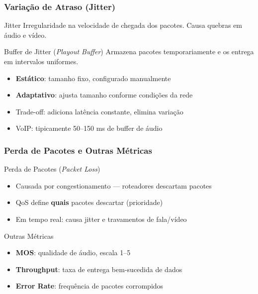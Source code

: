 \documentclass{beamer}
\begin{document}
  \begin{frame}
    \frametitle{Variação de Atraso (Jitter)}
    \begin{block}{Jitter}
      Irregularidade na velocidade de chegada dos pacotes. Causa quebras em
      áudio e vídeo.
    \end{block}
    \vspace{0.5em}
    \begin{block}{Buffer de Jitter (\textit{Playout Buffer})}
      Armazena pacotes temporariamente e os entrega em intervalos uniformes.
      \begin{itemize}
        \item<2-> \textbf{Estático}: tamanho fixo, configurado manualmente
        \item<3-> \textbf{Adaptativo}: ajusta tamanho conforme condições da rede
        \item<4-> Trade-off: adiciona latência constante, elimina variação
        \item<5-> VoIP: tipicamente 50--150 ms de buffer de áudio
      \end{itemize}
    \end{block}
  \end{frame}

  \begin{frame}
    \frametitle{Perda de Pacotes e Outras Métricas}
    \begin{block}{Perda de Pacotes (\textit{Packet Loss})}
      \begin{itemize}
        \item Causada por congestionamento — roteadores descartam pacotes
        \item QoS define \textbf{quais} pacotes descartar (prioridade)
        \item Em tempo real: causa jitter e travamentos de fala/vídeo
      \end{itemize}
    \end{block}
    \vspace{0.5em}
    \begin{block}{Outras Métricas}
      \begin{itemize}
        \item \textbf{MOS}: qualidade de áudio, escala 1--5
        \item \textbf{Throughput}: taxa de entrega bem-sucedida de dados
        \item \textbf{Error Rate}: frequência de pacotes corrompidos
      \end{itemize}
    \end{block}
  \end{frame}
\end{document}

